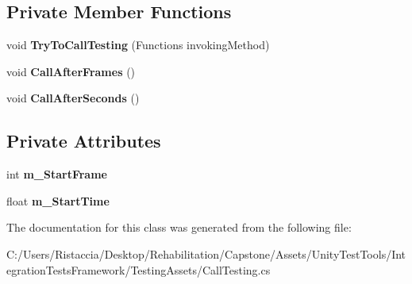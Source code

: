\subsection*{Private Member Functions}
\begin{DoxyCompactItemize}
\item 
\mbox{\label{class_unity_test_1_1_call_testing_a9d87684cd1ade391c3dda411864dae2a}} 
void {\bfseries Try\+To\+Call\+Testing} (Functions invoking\+Method)
\item 
\mbox{\label{class_unity_test_1_1_call_testing_ad259b9750912a8d8d7e2a5677f973b1f}} 
void {\bfseries Call\+After\+Frames} ()
\item 
\mbox{\label{class_unity_test_1_1_call_testing_ae2c0e2b9e618c79b4a5b5b88f908c417}} 
void {\bfseries Call\+After\+Seconds} ()
\end{DoxyCompactItemize}
\subsection*{Private Attributes}
\begin{DoxyCompactItemize}
\item 
\mbox{\label{class_unity_test_1_1_call_testing_a11d9578d89044c2ec3b0269867f9873e}} 
int {\bfseries m\+\_\+\+Start\+Frame}
\item 
\mbox{\label{class_unity_test_1_1_call_testing_ae182fce33b3aa1a99bbd7d51f51240c3}} 
float {\bfseries m\+\_\+\+Start\+Time}
\end{DoxyCompactItemize}


The documentation for this class was generated from the following file\+:\begin{DoxyCompactItemize}
\item 
C\+:/\+Users/\+Ristaccia/\+Desktop/\+Rehabilitation/\+Capstone/\+Assets/\+Unity\+Test\+Tools/\+Integration\+Tests\+Framework/\+Testing\+Assets/Call\+Testing.\+cs\end{DoxyCompactItemize}
